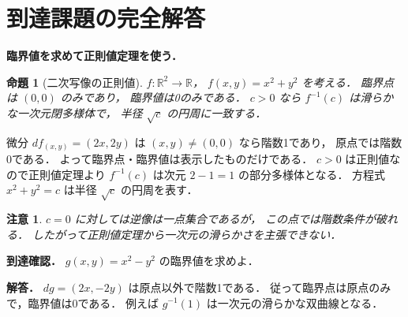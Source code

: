 \documentclass[a5paper,10pt,onecolumn]{jsarticle}
\makeatletter
\theoremstyle{mathnotetheorem}
\newtheorem{proposition}[theorem]{命題}
\newtheorem{remark}[theorem]{注意}
\renewcommand{\proofname}{証明}
\renewenvironment{proof}[1][\proofname]{%
  \par\pushQED{\qed}\normalfont\topsep4\p@\@plus2\p@\relax
  \trivlist\item[\hskip\labelsep\bfseries #1]\ignorespaces
}{\popQED\endtrivlist\@endpefalse}
\makeatother
\begin{document}
\section{到達課題の完全解答}
\noindent\textbf{臨界値を求めて正則値定理を使う．}
\begin{proposition}[二次写像の正則値]
$f:\mathbb R^2\to\mathbb R$，
$f(x,y)=x^2+y^2$ を考える．
臨界点は $(0,0)$ のみであり，
臨界値は0のみである．
$c>0$ なら $f^{-1}(c)$ は滑らかな一次元閉多様体で，
半径 $\sqrt c$ の円周に一致する．
\end{proposition}
\begin{proof}
微分 $df_{(x,y)}=(2x,2y)$ は
$(x,y)\ne(0,0)$ なら階数1であり，
原点では階数0である．
よって臨界点・臨界値は表示したものだけである．
$c>0$ は正則値なので正則値定理より
$f^{-1}(c)$ は次元 $2-1=1$ の部分多様体となる．
方程式 $x^2+y^2=c$ は半径 $\sqrt c$ の円周を表す．
\end{proof}
\begin{remark}
$c=0$ に対しては逆像は一点集合であるが，
この点では階数条件が破れる．
したがって正則値定理から一次元の滑らかさを主張できない．
\end{remark}
\noindent\textbf{到達確認．}
$g(x,y)=x^2-y^2$ の臨界値を求めよ．
\par\noindent\textbf{解答．}
$dg=(2x,-2y)$ は原点以外で階数1である．
従って臨界点は原点のみで，臨界値は0である．
例えば $g^{-1}(1)$ は一次元の滑らかな双曲線となる．
\end{document}
